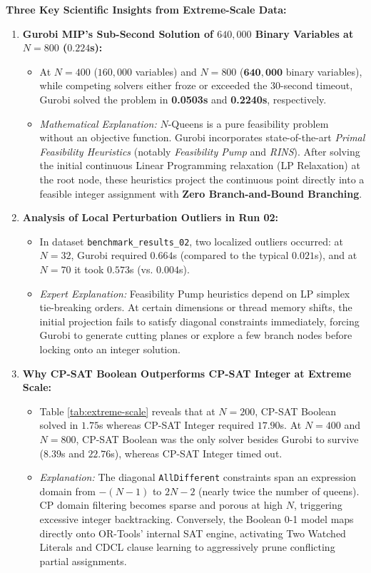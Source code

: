 \documentclass[a4paper,11pt]{article}
\begin{document}
\noindent \textbf{Three Key Scientific Insights from Extreme-Scale Data:}

\begin{enumerate}
    \item \textbf{Gurobi MIP's Sub-Second Solution of $640,000$ Binary Variables at $N=800$ ($0.224$s):}
    \begin{itemize}
        \item At $N = 400$ ($160,000$ variables) and $N = 800$ ($\mathbf{640,000}$ binary variables), while competing solvers either froze or exceeded the 30-second timeout, Gurobi solved the problem in \textbf{0.0503s} and \textbf{0.2240s}, respectively.
        \item \textit{Mathematical Explanation:} $N$-Queens is a pure feasibility problem without an objective function. Gurobi incorporates state-of-the-art \textit{Primal Feasibility Heuristics} (notably \textit{Feasibility Pump} and \textit{RINS}). After solving the initial continuous Linear Programming relaxation (LP Relaxation) at the root node, these heuristics project the continuous point directly into a feasible integer assignment with \textbf{Zero Branch-and-Bound Branching}.
    \end{itemize}

    \item \textbf{Analysis of Local Perturbation Outliers in Run 02:}
    \begin{itemize}
        \item In dataset \texttt{benchmark\_results\_02}, two localized outliers occurred: at $N=32$, Gurobi required $0.664$s (compared to the typical $0.021$s), and at $N=70$ it took $0.573$s (vs. $0.004$s).
        \item \textit{Expert Explanation:} Feasibility Pump heuristics depend on LP simplex tie-breaking orders. At certain dimensions or thread memory shifts, the initial projection fails to satisfy diagonal constraints immediately, forcing Gurobi to generate cutting planes or explore a few branch nodes before locking onto an integer solution.
    \end{itemize}

    \item \textbf{Why CP-SAT Boolean Outperforms CP-SAT Integer at Extreme Scale:}
    \begin{itemize}
        \item Table \ref{tab:extreme-scale} reveals that at $N=200$, CP-SAT Boolean solved in $1.75$s whereas CP-SAT Integer required $17.90$s. At $N=400$ and $N=800$, CP-SAT Boolean was the only solver besides Gurobi to survive ($8.39$s and $22.76$s), whereas CP-SAT Integer timed out.
        \item \textit{Explanation:} The diagonal \texttt{AllDifferent} constraints span an expression domain from $-(N-1)$ to $2N-2$ (nearly twice the number of queens). CP domain filtering becomes sparse and porous at high $N$, triggering excessive integer backtracking. Conversely, the Boolean 0-1 model maps directly onto OR-Tools' internal SAT engine, activating Two Watched Literals and CDCL clause learning to aggressively prune conflicting partial assignments.
    \end{itemize}
\end{enumerate}
\end{document}
